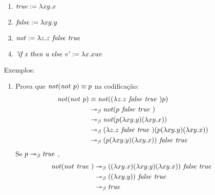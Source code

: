 \documentclass[../main.tex]{subfiles}
\begin{document}
\begin{definition}[Booleanos]
    \hfill
    \begin{enumerate}
        \item $\text{\emph{true}} := \lambda xy . x$
        \item $\text{\emph{false}} := \lambda xy . y$
        \item $\text{\emph{not}} := \lambda z . z \text{\emph{ false }} \text{\emph{true }}$
        \item $\text{\emph{'if x then u else v'}} := \lambda x . xuv$
    \end{enumerate}
\end{definition}

Exemplos: 

\begin{enumerate}
    \item Prova que $\text{\emph{not}}(\text{\emph{not }} p)\equiv p$ na codificação:
    \begin{equation*}
        \begin{split}
            \text{\emph{not}}(\text{\emph{not }} p) & \equiv \text{\emph{not}}((\lambda z . z \text{\emph{ false }} \text{\emph{true }}) p)
                                   \\ & \twoheadrightarrow_{\beta} \text{\emph{not}}(p \text{\emph{ false }} \text{\emph{true }})
                                   \\ & \twoheadrightarrow_{\beta} \text{\emph{not}}(p (\lambda xy . y) (\lambda xy . x))
                                   \\ & \twoheadrightarrow_{\beta} (\lambda z . z \text{\emph{ false }} \text{\emph{true }})(p (\lambda xy . y) (\lambda xy . x))
                                   \\ & \twoheadrightarrow_{\beta} (p (\lambda xy . y) (\lambda xy . x)) \text{\emph{ false }} \text{\emph{true }}
        \end{split}
    \end{equation*}
    Se $p \twoheadrightarrow_{\beta} \text{\emph{true }}$,
    \begin{equation*}
        \begin{split}
            \text{\emph{not}}(\text{\emph{not }} \text{\emph{true }}) & \twoheadrightarrow_{\beta} ((\lambda xy . x) (\lambda xy . y) (\lambda xy . x)) \text{\emph{ false }} \text{\emph{true }} \\ & \twoheadrightarrow_{\beta} ((\lambda xy . y)) \text{\emph{ false }} \text{\emph{true }} \\ & \twoheadrightarrow_{\beta} \text{\emph{true }}

\end{split}
\end{equation*}
\end{enumerate}
\end{document}

